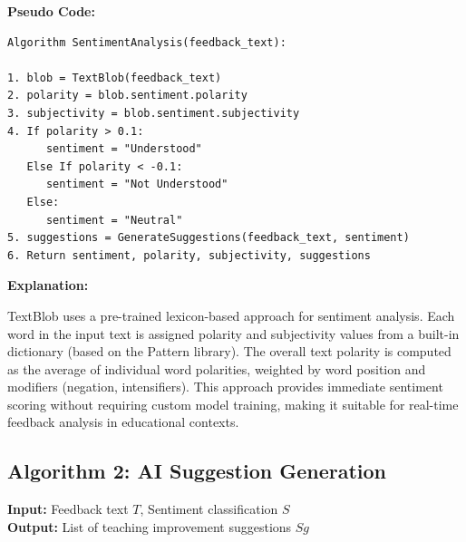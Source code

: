 \textbf{Pseudo Code:}

\begin{verbatim}
Algorithm SentimentAnalysis(feedback_text):

1. blob = TextBlob(feedback_text)
2. polarity = blob.sentiment.polarity
3. subjectivity = blob.sentiment.subjectivity
4. If polarity > 0.1:
      sentiment = "Understood"
   Else If polarity < -0.1:
      sentiment = "Not Understood"
   Else:
      sentiment = "Neutral"
5. suggestions = GenerateSuggestions(feedback_text, sentiment)
6. Return sentiment, polarity, subjectivity, suggestions
\end{verbatim}

\textbf{Explanation:}

TextBlob uses a pre-trained lexicon-based approach for sentiment analysis. Each word in the input text is assigned polarity and subjectivity values from a built-in dictionary (based on the Pattern library). The overall text polarity is computed as the average of individual word polarities, weighted by word position and modifiers (negation, intensifiers). This approach provides immediate sentiment scoring without requiring custom model training, making it suitable for real-time feedback analysis in educational contexts.

\subsection{Algorithm 2: AI Suggestion Generation}

\textbf{Input:} Feedback text $T$, Sentiment classification $S$ \\
\textbf{Output:} List of teaching improvement suggestions $Sg$

